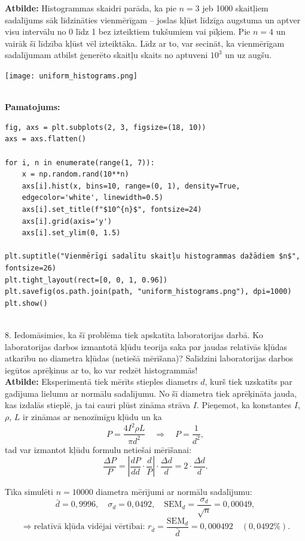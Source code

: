\documentclass[12pt]{article}
\begin{document}
\textbf{Atbilde:} Histogrammas skaidri parāda, ka pie $n=3 $ jeb 1000 skaitļiem sadalījums sāk līdzināties vienmērīgam – joslas kļūst līdzīga augstuma un aptver visu intervālu no 0 līdz 1 bez izteiktiem tukšumiem vai pīķiem. Pie $n=4$ un vairāk šī līdzība kļūst vēl izteiktāka. Līdz ar to, var secināt, ka vienmērīgam sadalījumam atbilst ģenerēto skaitļu skaits no aptuveni $10^3$ un uz augšu.
\begin{center}
    \texttt{[image: uniform\_histograms.png]}
\end{center}\\

\textbf{Pamatojums:}
\begin{verbatim}
fig, axs = plt.subplots(2, 3, figsize=(18, 10))
axs = axs.flatten()

for i, n in enumerate(range(1, 7)):
    x = np.random.rand(10**n)
    axs[i].hist(x, bins=10, range=(0, 1), density=True, 
    edgecolor='white', linewidth=0.5)
    axs[i].set_title(f"$10^{n}$", fontsize=24)
    axs[i].grid(axis='y')
    axs[i].set_ylim(0, 1.5)

plt.suptitle("Vienmērīgi sadalītu skaitļu histogrammas dažādiem $n$", fontsize=26)
plt.tight_layout(rect=[0, 0, 1, 0.96])
plt.savefig(os.path.join(path, "uniform_histograms.png"), dpi=1000)
plt.show()
\end{verbatim}\\

8. Iedomāsimies, ka šī problēma tiek apskatīta laboratorijas darbā. Ko laboratorijas darbos izmantotā kļūdu teorija saka par jaudas relatīvās kļūdas atkarību no diametra kļūdas (netiešā mērīšana)? Salīdzini laboratorijas darbos iegūtos aprēķinus ar to, ko var redzēt histogrammās!\\

\textbf{Atbilde:}
Eksperimentā tiek mērīts stieples diametrs $d$, kurš tiek uzskatīts par gadījuma lielumu ar normālu sadalījumu. No šī diametra tiek aprēķināta jauda, kas izdalās stieplē, ja tai cauri plūst zināma strāva $I$. Pieņemot, ka konstantes $I$, $\rho$, $L$ ir zināmas ar nenozīmīgu kļūdu un ka
\[
P = \frac{4 I^2 \rho L}{\pi d^2} \quad \Rightarrow \quad P = \frac{1}{d^2},
\]
tad var izmantot kļūdu formulu netiešai mērīšanai:
\[
\frac{\Delta P}{P} = \left| \frac{dP}{dd} \cdot \frac{d}{P} \right| \cdot \frac{\Delta d}{d} = 2 \cdot \frac{\Delta d}{d}.
\]

Tika simulēti $n = 10000$ diametra mērījumi ar normālu sadalījumu:
\[
\bar{d} = 0{,}9996, \quad \sigma_d = 0{,}0492, \quad \text{SEM}_d = \frac{\sigma_d}{\sqrt{n}} = 0{,}00049,
\]
\[
\Rightarrow \text{relatīvā kļūda vidējai vērtībai: } r_{\bar{d}} = \frac{\text{SEM}_d}{\bar{d}} = 0{,}000492 \quad (0{,}0492\%).
\]
\end{document}

